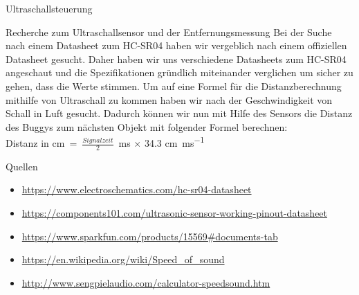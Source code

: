 \documentclass[12pt]{report}
\begin{document}
\begin{section}{Ultraschallsteuerung}
    \begin{subsection}{Recherche zum Ultraschallsensor und der Entfernungsmessung}
        Bei der Suche nach einem Datasheet zum HC-SR04 haben wir vergeblich nach
        einem offiziellen Datasheet gesucht. Daher haben wir uns  verschiedene 
        Datasheets zum HC-SR04 angeschaut und die Spezifikationen gründlich
        miteinander verglichen um sicher zu gehen, dass die Werte stimmen.
        Um auf eine Formel für die Distanzberechnung mithilfe von Ultraschall
        zu kommen haben wir nach der Geschwindigkeit von Schall in Luft gesucht.
        Dadurch können wir nun mit Hilfe des Sensors die Distanz des Buggys zum
        nächsten Objekt mit folgender Formel berechnen:\\
        Distanz in \si\cm = \( \frac{Signalzeit}{2} \) \si{\milli\second} $ \times $ 34.3 \si[per-mode = fraction]{\cm\per\milli\second}
        

        \begin{paragraph}{Quellen}
        \begin{itemize}
            \item \url{https://www.electroschematics.com/hc-sr04-datasheet}
            \item \url{https://components101.com/ultrasonic-sensor-working-pinout-datasheet}
            \item \url{https://www.sparkfun.com/products/15569\#documents-tab}
            \item \url{https://en.wikipedia.org/wiki/Speed\_of\_sound}
            \item \url{http://www.sengpielaudio.com/calculator-speedsound.htm}
        \end{itemize}
        \end{paragraph}
    \end{subsection}


\end{section}
\end{document}
